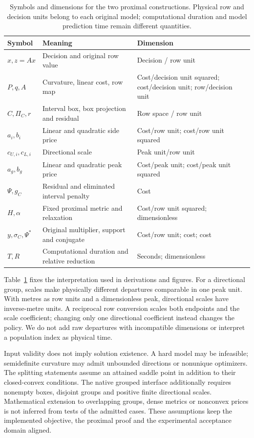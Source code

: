 \begin{table}[htbp]\centering\small
\caption{Symbols and dimensions for the two proximal constructions. Physical row and decision units belong to each original model; computational duration and model prediction time remain different quantities.}\label{tab:paper-notation}
\begin{tabularx}{\textwidth}{@{}lXX@{}}\toprule
Symbol & Meaning & Dimension\\\midrule
$x,z=Ax$ & Decision and original row value & Decision / row unit\\
$P,q,A$ & Curvature, linear cost, row map & Cost/decision unit squared; cost/decision unit; row/decision unit\\
$C,\Pi_C,r$ & Interval box, box projection and residual & Row space / row unit\\
$a_i,b_i$ & Linear and quadratic side price & Cost/row unit; cost/row unit squared\\
$c_{U,i},c_{L,i}$ & Directional scale & Peak unit/row unit\\
$a_g,b_g$ & Linear and quadratic peak price & Cost/peak unit; cost/peak unit squared\\
$\Psi,g_C$ & Residual and eliminated interval penalty & Cost\\
$H,\alpha$ & Fixed proximal metric and relaxation & Cost/row unit squared; dimensionless\\
$y,\sigma_C,\Psi^*$ & Original multiplier, support and conjugate & Cost/row unit; cost; cost\\
$T,R$ & Computational duration and relative reduction & Seconds; dimensionless\\\bottomrule
\end{tabularx}
\end{table}

Table~\ref{tab:paper-notation} fixes the interpretation used in derivations
and figures. For a directional group, scales make physically different
departures comparable in one peak unit. With metres as row units and a
dimensionless peak, directional scales have inverse-metre units. A
reciprocal row conversion scales both endpoints and the scale coefficient;
changing only one directional coefficient instead changes the policy.
We do not add raw departures with incompatible dimensions or interpret a
population index as physical time.

Input validity does not imply solution existence. A hard model may be
infeasible; semidefinite curvature may admit unbounded directions or
nonunique optimizers. The splitting statements assume an attained saddle
point in addition to their closed-convex conditions. The native grouped
interface additionally requires nonempty boxes, disjoint groups and positive
finite directional scales. Mathematical extension to overlapping groups,
dense metrics or nonconvex prices is not inferred from tests of the
admitted cases. These assumptions keep the implemented objective, the
proximal proof and the experimental acceptance domain aligned.

